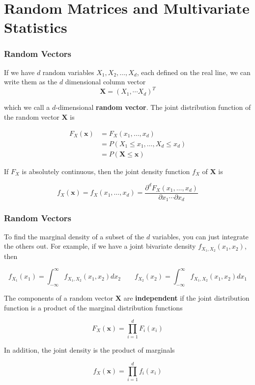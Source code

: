 \documentclass{beamer}
\begin{document}
\section{Random Matrices and Multivariate Statistics}
\begin{frame}
\frametitle{Random Vectors}
If we have $d$ random variables $X_1, X_2, \hdots, X_d$, each defined on the real line, we can write them as the $d$ dimensional column vector $$\mathbf{X} = (X_1, \cdots X_d)^T$$

which we call a $d$-dimensional \textbf{random vector}.  The joint distribution function of the random vector $\mathbf{X}$ is

\begin{align*}
F_X(\mathbf{x}) &= F_X(x_1, \hdots, x_d) \\
&= P(X_1 \leq x_1, \hdots, X_d \leq x_d)\\
&= P(\mathbf{X} \leq \mathbf{x})
\end{align*}

If $F_X$ is absolutely continuous, then the joint density function $f_X$ of $\mathbf{X}$ is

$$f_X(\mathbf{x}) = f_X(x_1, \hdots, x_d) = \frac{\partial ^d F_X(x_1, \hdots, x_d)}{\partial x_1 \cdots \partial x_d}$$
\end{frame}

\begin{frame}
\frametitle{Random Vectors}
To find the marginal density of a subset of the $d$ variables, you can just integrate the others out.  For example, if we have a joint bivariate density $f_{X_1,X_2}(x_1, x_2)$, then 

$$f_{X_1}(x_1) = \int_{-\infty}^{\infty} f_{X_1,X_2}(x_1, x_2) dx_2 \qquad f_{X_2}(x_2) = \int_{-\infty}^{\infty} f_{X_1,X_2}(x_1, x_2) dx_1$$

The components of a random vector $\mathbf{X}$ are \textbf{independent} if the joint distribution function is a product of the marginal distribution functions

$$F_X(\mathbf{x}) = \prod_{i=1}^d F_i(x_i)$$

In addition, the joint density is the product of marginals

$$f_X(\mathbf{x}) = \prod_{i=1}^d f_i(x_i)$$
\end{frame}
\end{document}
